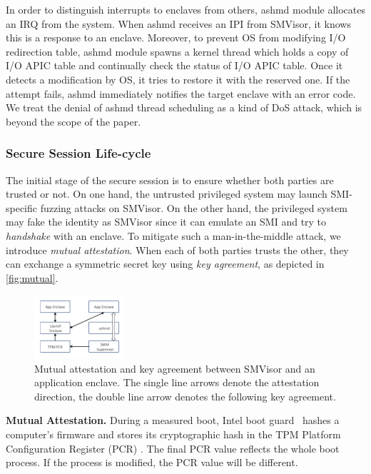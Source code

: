 In order to distinguish interrupts to enclaves from others, ashmd module allocates an IRQ from the system. When ashmd receives an IPI from  SMVisor, it knows this is a response to an enclave.
Moreover, to prevent OS from modifying I/O redirection table, ashmd module spawns a kernel thread which holds a copy of  I/O APIC table and continually check the status of I/O APIC  table. Once it detects a modification by OS, it tries to restore it with the reserved one. If the attempt fails, ashmd  immediately notifies the target enclave with an error code.  We treat the denial of ashmd thread scheduling as a kind of DoS attack, which is beyond the scope of the paper.

\subsubsection{Secure Session Life-cycle}
The initial stage of the secure session is to ensure whether both parties are trusted or not. On one hand, the untrusted privileged system may launch SMI-specific fuzzing attacks on  SMVisor. On the other hand, the privileged system may fake the identity as  SMVisor since it can emulate an SMI and try to \textit{handshake} with an enclave. To mitigate such a man-in-the-middle attack, we introduce \textit{mutual attestation}. When each of both parties trusts the other, they can exchange a symmetric secret key using \textit{key agreement}, as depicted in \autoref{fig:mutual}. %

\begin{figure}[t]
\centering
\includegraphics[width=0.3\textwidth]{figures/mutual.pdf}%
\caption{Mutual attestation and key agreement between SMVisor and an application enclave. The single line arrows denote the attestation direction, the double line arrow denotes the following key agreement.}
\label{fig:mutual}
\end{figure}

\textbf{Mutual Attestation.}
During a measured boot, Intel boot guard~\cite{ruan_platform_2014}  hashes a computer's firmware and stores its cryptographic hash in the TPM Platform Configuration Register (PCR) \cite{tcg_trusted_2014}. The final PCR value reflects the whole boot process. If the process is modified, the PCR value will be different.

